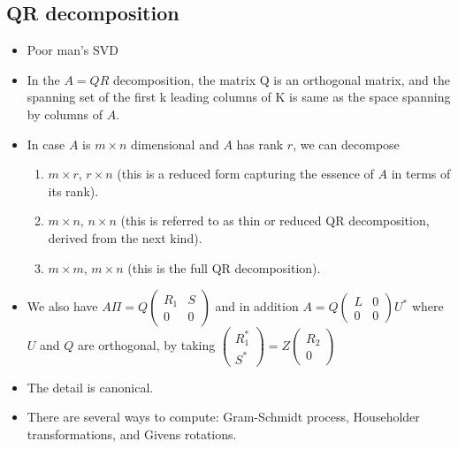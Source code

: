 \documentclass[11pt,reqno]{amsart}
\theoremstyle{remark}
\begin{document}
\subsection{QR decomposition}
\begin{itemize}
\item Poor man's SVD
\item In the $A=QR$ decomposition, the matrix Q is an orthogonal matrix, 
and the spanning set of the first k leading columns of K is same as
 the space spanning by columns of $A$.
\item In case $A$ is $m\times n$ dimensional and $A$ has rank $r$, we
 can decompose
\begin{enumerate}
\item $m\times r$, $r\times n$ (this is a reduced form capturing the essence of $A$ in terms of its rank).
\item $m\times n$, $n\times n$ (this is referred to as thin or reduced QR decomposition, derived from the next kind).
\item $m\times m$, $m\times n$ (this is the full QR decomposition).
\end{enumerate}
\item We also have $A\Pi=Q
\begin{pmatrix}
  R_1 & S \\
  0 & 0
\end{pmatrix}
  $ and in addition $A=Q\begin{pmatrix}
    L & 0 \\ 0 & 0
  \end{pmatrix} U^*$ where $U$ and $Q$ are orthogonal, by taking $\begin{pmatrix}
  R_1^* \\ S^*
  \end{pmatrix}=Z\begin{pmatrix}
  R_2 \\ 0
  \end{pmatrix}$
\item The detail is canonical.
\item There are several ways to compute: Gram-Schmidt process, Householder transformations,
 and Givens rotations.
\end{itemize}
\end{document}
